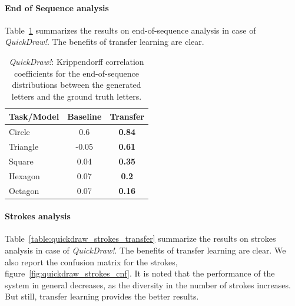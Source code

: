       \paragraph{End of Sequence analysis}
        Table~\ref{table:quickdraw_eos_transfer} summarizes the results on end-of-sequence analysis in case of \textit{QuickDraw!}. The benefits of transfer learning are clear.
        \begin{table}[!htbp]
          \centering
          \begin{tabular}{l c c} \hline

          Task/Model & Baseline & Transfer \\ \hline
          Circle &  0.6 & \textbf{0.84} \\ %
          Triangle & -0.05 & \textbf{0.61} \\ %
          Square &  0.04 &  \textbf{0.35} \\ %
          Hexagon &  0.07 &  \textbf{0.2} \\ %
          Octagon &  0.07 &  \textbf{0.16} \\ \hline

          \end{tabular}
          \caption{\textit{QuickDraw!}: Krippendorff correlation coefficients for the end-of-sequence distributions between the generated letters and the ground truth letters.}
          \label{table:quickdraw_eos_transfer}
        \end{table}

      \paragraph{Strokes analysis}
        Table~\ref{table:quickdraw_strokes_transfer} summarize the results on strokes analysis in case of \textit{QuickDraw!}. The benefits of transfer learning are clear. We also report the confusion matrix for the strokes, figure~\ref{fig:quickdraw_strokes_cnf}. It is noted that the performance of the system in general decreases, as the diversity in the number of strokes increases. But still, transfer learning provides the better results.

